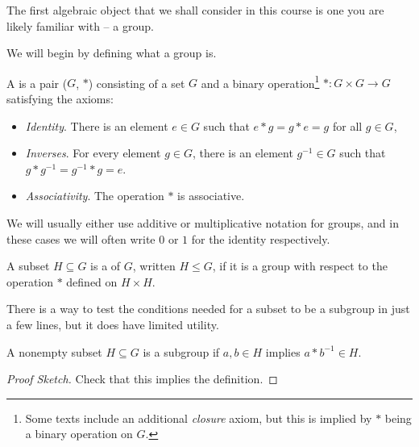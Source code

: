 \documentclass[a4paper]{scrartcl}
\begin{document}






The first algebraic object that we shall consider in this course is one you are likely familiar with -- a group. 


We will begin by defining what a group is.

\begin{definition}[Group]
	A  is a pair ($G$, $*$) consisting of a set $G$ and a binary operation\footnote{Some texts include an additional \emph{closure} axiom, but this is implied by $*$ being a binary operation on $G$.} $* : G \times G \rightarrow G$ satisfying the axioms:
	\begin{itemize}
		\item \emph{Identity}. There is an element $e \in G$ such that $e * g = g * e = g$ for all $g \in G$,
		\item \emph{Inverses}. For every element $g \in G$, there is an element $g^{-1} \in G$ such that $g * g^{-1} = g^{-1} * g = e$.
		\item \emph{Associativity}. The operation $*$ is associative.
	\end{itemize}
\end{definition}

\begin{remark}
	We will usually either use additive or multiplicative notation for groups, and in these cases we will often write $0$ or $1$ for the identity respectively.
\end{remark}

\begin{definition}[Subgroup]
	A subset $H \subseteq G$ is a  of $G$, written $H \leq G$, if it is a group with respect to the operation $*$ defined on $H \times H$.
\end{definition}

There is a way to test the conditions needed for a subset to be a subgroup in just a few lines, but it does have limited utility.

\begin{lemma}
A nonempty subset $H \subseteq G$ is a subgroup if $a, b \in H$ implies $a * b^{-1} \in H$.
\end{lemma}
\begin{proof}[Proof Sketch]
	Check that this implies the definition.
\end{proof}
\end{document}
